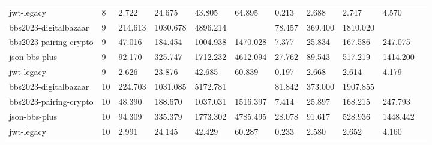 \begin{table}[t]
\begin{tabular}{lllllllllll}
jwt-legacy & 8 & 2.722 & 24.675 & 43.805 & 64.895 & 0.213 & 2.688 & 2.747 & 4.570 \\
bbs2023-digitalbazaar & 9 & 214.613 & 1030.678 & 4896.214 &  & 78.457 & 369.400 & 1810.020 &  \\
bbs2023-pairing-crypto & 9 & 47.016 & 184.454 & 1004.938 & 1470.028 & 7.377 & 25.834 & 167.586 & 247.075 \\
json-bbs-plus & 9 & 92.170 & 325.747 & 1712.232 & 4612.094 & 27.762 & 89.543 & 517.219 & 1414.200 \\
jwt-legacy & 9 & 2.626 & 23.876 & 42.685 & 60.839 & 0.197 & 2.668 & 2.614 & 4.179 \\
bbs2023-digitalbazaar & 10 & 224.703 & 1031.085 & 5172.781 &  & 81.842 & 373.000 & 1907.855 &  \\
bbs2023-pairing-crypto & 10 & 48.390 & 188.670 & 1037.031 & 1516.397 & 7.414 & 25.897 & 168.215 & 247.793 \\
json-bbs-plus & 10 & 94.309 & 335.379 & 1773.302 & 4785.495 & 28.078 & 91.617 & 528.936 & 1448.442 \\
jwt-legacy & 10 & 2.991 & 24.145 & 42.429 & 60.287 & 0.233 & 2.580 & 2.652 & 4.160 \\
\bottomrule
\end{tabular}
\end{table}

